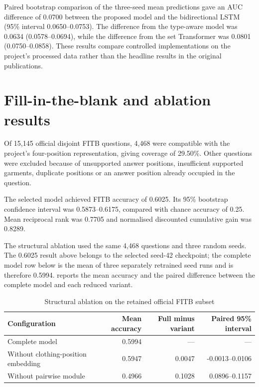 Paired bootstrap comparison of the three-seed mean predictions gave an AUC
difference of 0.0700 between the proposed model and the bidirectional LSTM
(95\% interval 0.0650--0.0753). The difference from the type-aware model was
0.0634 (0.0578--0.0694), while the difference from the set Transformer was
0.0801 (0.0750--0.0858). These results compare controlled implementations on
the project's processed data rather than the headline results in the original
publications.

\section{Fill-in-the-blank and ablation results}

Of 15,145 official disjoint FITB questions, 4,468 were compatible with the
project's four-position representation, giving coverage of 29.50\%. Other
questions were excluded because of unsupported answer positions, insufficient
supported garments, duplicate positions or an answer position already occupied
in the question.

The selected model achieved FITB accuracy of 0.6025. Its 95\% bootstrap
confidence interval was 0.5873--0.6175, compared with chance accuracy of 0.25.
Mean reciprocal rank was 0.7705 and normalised discounted cumulative gain was
0.8289.

The structural ablation used the same 4,468 questions and three random seeds.
The 0.6025 result above belongs to the selected seed-42 checkpoint; the complete
model row below is the mean of three separately retrained seed runs and is
therefore 0.5994.
 reports the mean accuracy and the paired difference
between the complete model and each reduced variant.

\begin{table}[htbp]
  \centering
  \caption{Structural ablation on the retained official FITB subset}
  \label{tab:ablation-results}
  \begin{tabularx}{\textwidth}{>{\raggedright\arraybackslash}Xrrr}
    \toprule
    Configuration & Mean accuracy & Full minus variant & Paired 95\% interval \\
    \midrule
    Complete model & 0.5994 & --- & --- \\
    Without clothing-position embedding & 0.5947 & 0.0047 & -0.0013--0.0106 \\
    Without pairwise module & 0.4966 & 0.1028 & 0.0896--0.1157 \\
    \bottomrule
  \end{tabularx}
\end{table}


